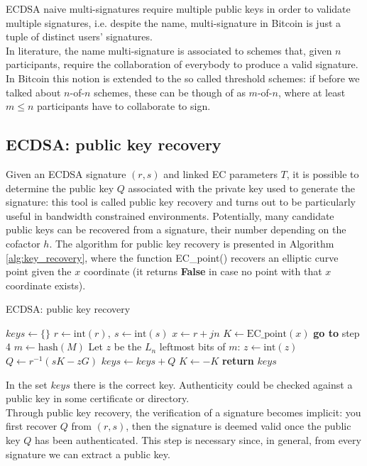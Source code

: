 \bigskip
\noindent
ECDSA naive multi-signatures require multiple public keys in order to validate multiple signatures, i.e. despite the name, multi-signature in Bitcoin is just a tuple of distinct users' signatures.
\\
In literature, the name multi-signature is associated to schemes that, given $n$ participants, require the collaboration of everybody to produce a valid signature. In Bitcoin this notion is extended to the so called threshold schemes: if before we talked about $n$-of-$n$ schemes, these can be though of as $m$-of-$n$, where at least $m \leq n$ participants have to collaborate to sign.

\bigskip

\subsection{ECDSA: public key recovery}
Given an ECDSA signature $(r, s)$ and linked EC parameters $T$, it is possible to determine the public key $Q$ associated with the private key used to generate the signature: this tool is called public key recovery and turns out to be particularly useful in bandwidth constrained environments. Potentially, many candidate public keys can be recovered from a signature, their number depending on the cofactor $h$. The algorithm for public key recovery is presented in Algorithm \ref{alg:key_recovery}, where the function EC\_point() recovers an elliptic curve point given the $x$ coordinate (it returns \textbf{False} in case no point with that $x$ coordinate exists).

\bigskip

\begin{algorithm}
	\caption{ECDSA: public key recovery}
	\label{alg:key_recovery}
	\begin{algorithmic}[1]
		\State $keys \gets \{\}$
		\State $r \gets \text{int}(r), \ s \gets \text{int}(s)$
		\State $x \gets r + jn$
		\State $K \gets \text{EC\_point}(x)$
		\State \textbf{go to} step 4
		\EndIf
		\State $m \gets \text{hash}(M)$
		\State Let $z$ be the $L_n$ leftmost bits of $m$: $z \gets \text{int}(z)$
		\State $Q \gets r^{-1}(sK - zG)$
		\State $keys \gets keys + Q$
		\State $K \gets -K$
		\EndFor
		\EndFor
		\State \textbf{return} $keys$
		\EndProcedure
	\end{algorithmic}
\end{algorithm}
\noindent
In the set $keys$ there is the correct key. Authenticity could be checked against a public key in some certificate or directory.
\\
Through public key recovery, the verification of a signature becomes implicit: you first recover $Q$ from $(r, s)$, then the signature is deemed valid once the public key $Q$ has been authenticated. This step is necessary since, in general, from every signature we can extract a public key.

